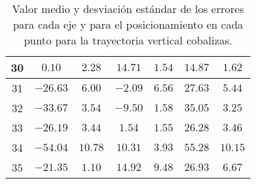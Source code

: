 \begin{table}[H]
\begin{tabular}{|c|c|c|c|c|c|c|}
        30  &    $0.10$    &  $2.28$  & $14.71$  &  $1.54$  & $14.87$  &  $1.62$  \\ \hline
        31  &    $-26.63$  &  $6.00$  & $-2.09$  &  $6.56$  & $27.63$  &  $5.44$  \\ \hline
        32  &    $-33.67$  &  $3.54$  & $-9.50$  &  $1.58$  & $35.05$  &  $3.25$  \\ \hline
        33  &    $-26.19$  &  $3.44$  & $1.54$   &  $1.55$  & $26.28$  &  $3.46$  \\ \hline
        34  &    $-54.04$  &  $10.78$ & $10.31$  &  $3.93$  & $55.28$  &  $10.15$  \\ \hline
        35  &    $-21.35$  &  $1.10$  & $14.92$  &  $9.48$  & $26.93$  &  $6.67$  \\ \hline
    \end{tabular}
    \caption{Valor medio y desviación estándar de los errores para cada eje y para el posicionamiento en cada punto para la trayectoria vertical cobalizas.}
    \label{tab:media_lab_4_vertical}    
\end{table}

